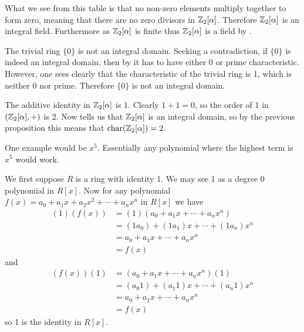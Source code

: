 \begin{questions}
    What we see from this table is that no non-zero elements multiply together to form zero, meaning that there are no zero divisors in $\mathbb{Z}_2[\alpha]$. Therefore $\mathbb{Z}_2[\alpha]$ is an integral field. Furthermore as $\mathbb{Z}_2[\alpha]$ is finite thus $\mathbb{Z}_2[\alpha]$ is a field by .

    \item The trivial ring $\{0\}$ is not an integral domain. Seeking a contradiction, if $\{0\}$ is indeed an integral domain, then by it has to have either 0 or prime characteristic. However, one sees clearly that the characteristic of the trivial ring is 1, which is neither 0 nor prime. Therefore $\{0\}$ is not an integral domain.

    \item The additive identity in $\mathbb{Z}_2[\alpha]$ is 1. Clearly $1 + 1 = 0$, so the order of 1 in $(\mathbb{Z}_2[\alpha],+)$ is 2. Now  tells us that $\mathbb{Z}_2[\alpha]$ is an integral domain, so by the previous proposition this means that $\mathrm{char}(\mathbb{Z}_2[\alpha]) = 2$.
    
    \item One example would be $x^5$. Essentially any polynomial where the highest term is $x^5$ would work.
    
    \item \begin{partquestions}{\alph*}
        \item We first suppose $R$ is a ring with identity 1. We may see 1 as a degree 0 polynomial in $R[x]$. Now for any polynomial $f(x) = a_0+a_1x+a_2x^2+\cdots+a_nx^n$ in $R[x]$ we have
        \begin{align*}
            (1)(f(x)) &= (1)(a_0+a_1x+\cdots+a_nx^n)\\
            &= (1a_0)+(1a_1)x+\cdots+(1a_n)x^n\\
            &= a_0+a_1x+\cdots+a_nx^n\\
            &= f(x)
        \end{align*}
        and
        \begin{align*}
            (f(x))(1) &= (a_0+a_1x+\cdots+a_nx^n)(1)\\
            &= (a_{0}1)+(a_{1}1)x+\cdots+(a_{n}1)x^n\\
            &= a_0+a_1x+\cdots+a_nx^n\\
            &= f(x)
        \end{align*}
        so 1 is the identity in $R[x]$.


\end{partquestions}
\end{questions}
